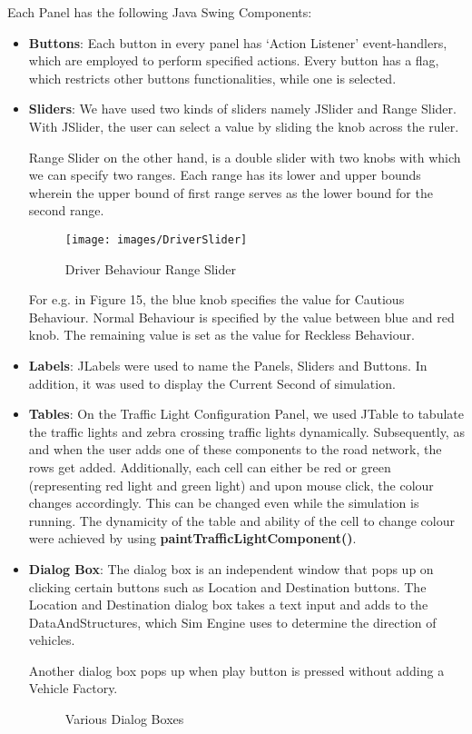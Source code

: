 \documentclass[11pt,a4paper]{article}
\begin{document}
	
	Each Panel has the following Java Swing Components:
	\begin{itemize}
		\item \textbf{Buttons}: Each button in every panel has ‘Action Listener’ event-handlers, which are employed to perform specified actions. Every button has a flag, which restricts other buttons functionalities, while one is selected.
		\item \textbf{Sliders}: We have used two kinds of sliders namely JSlider and Range Slider. With JSlider, the user can select a value by sliding the knob across the ruler. 
			
			Range Slider on the other hand, is a double slider with two
			knobs with which we can specify two ranges. Each range has
			its lower and upper bounds wherein the upper bound of first range serves as the lower bound for the second range.\cite{ernie10}
			 
			 \begin{figure}[h!]
				\texttt{[image: images/DriverSlider]}
				\caption{Driver Behaviour Range Slider}
				\centering
			\end{figure}
		
			For e.g. in Figure 15, the blue knob specifies the value
			for Cautious Behaviour. Normal Behaviour is specified by
			the value between blue and red knob. The remaining value is
			set as the value for Reckless Behaviour.
		\item \textbf{Labels}: JLabels were used to name the Panels, Sliders and Buttons. In addition, it was used to display the Current Second of simulation.
		\item \textbf{Tables}: On the Traffic Light Configuration Panel, we used JTable to tabulate the traffic lights and zebra crossing traffic lights dynamically. Subsequently, as and when the user adds one of these components to the road network, the rows get added. 
			Additionally, each cell can either be red or green
			(representing red light and green light) and upon mouse
			click, the colour changes accordingly. This can be changed
			even while the simulation is running.
			The dynamicity of the table and ability of the cell to
			change colour were achieved by using	\textbf{paintTrafficLightComponent()}.
		\item \textbf{Dialog Box}: The dialog box is an independent window that pops up on clicking certain buttons such as Location and Destination buttons. The Location and Destination dialog box takes a text input and adds to the DataAndStructures, which Sim Engine uses to determine the direction of vehicles.
			
			Another dialog box pops up when play button is pressed
			without adding a Vehicle Factory.

			\begin{figure}[h!]
				\setlength\fboxsep{0pt}
				\setlength\fboxrule{0.5pt}
				\caption{Various Dialog Boxes}
				\centering
			\end{figure}
	\end{itemize}
\end{document}
